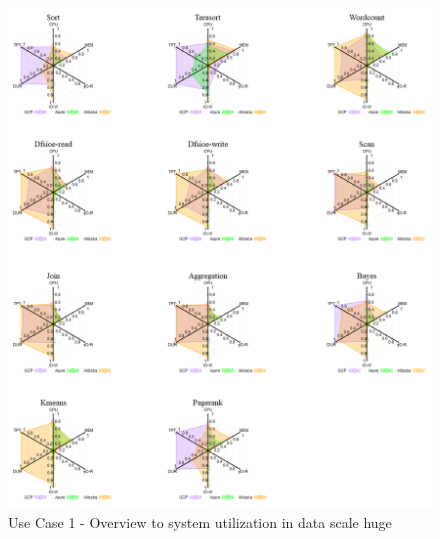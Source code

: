\documentclass[review]{elsarticle}
\begin{document}
	\begin{figure}[p]
		\caption{Use Case 1 - Overview to system utilization in data scale huge}
		\label{fig:uc1-huge-new}
		\includegraphics[width=\textwidth]{uc1-huge-new}
		\centering
	\end{figure}
	
\end{document}

